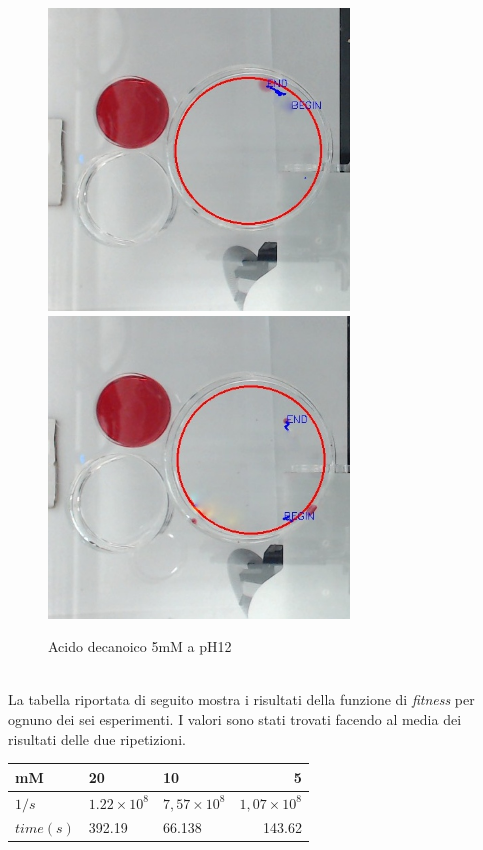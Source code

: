 \begin{figure}[h]
	\centering
   		{\includegraphics[width=8cm]{immagini/5mMpH12-1.jpg}}
 	\hspace{2mm}   	
		{\includegraphics[width=8cm]{immagini/5mMpH12-2.jpg}}
	\caption{Acido decanoico 5mM a pH12}
\end{figure}
\pagebreak
\\La tabella riportata di seguito mostra i risultati della funzione di \emph{fitness} per ognuno dei sei esperimenti. I valori sono stati trovati facendo al media dei risultati delle due ripetizioni.
\begin{center}
\begin{tabular}{|l|l|l|r|}
	\hline
	mM&20&10&5\\
	\hline
	$1/s$&$1.22\times { 10 }^{ 8 }$&$7,57\times { 10 }^{ 8 }$&$1,07\times { 10 }^{ 8 }$\\
	\hline
	$time(s)$& 392.19 & 66.138 & 143.62\\
	\hline
\end{tabular}
\end{center}
\pagebreak

